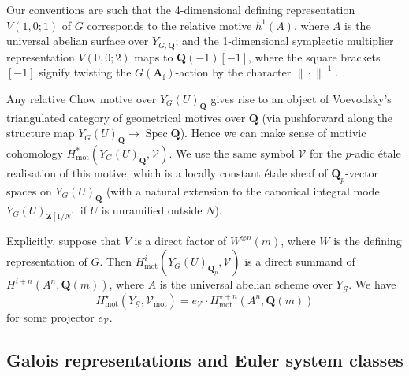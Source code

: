 \documentclass[cjm]{ipart}
\theoremstyle{plain}
\theoremstyle{remark}
\DeclareMathOperator{\mot}{mot}
\DeclareMathOperator{\Spec}{Spec}
\newcommand{\Af}{\AA_{\mathrm{f}}}
\newcommand{\QQ}{\mathbf{Q}}
\newcommand{\Qp}{\QQ_p}
\newcommand{\ZZ}{\mathbf{Z}}
\newcommand{\cV}{\mathcal{V}}
\newcommand{\sG}{\mathscr{G}}
\renewcommand{\AA}{\mathbf{A}}
\numberwithin{equation}{subsection}
\begin{document}
  \begin{remark}
   Our conventions are such that the 4-dimensional defining representation $V(1, 0; 1)$ of $G$ corresponds to the relative motive $h^1(A)$, where $A$ is the universal abelian surface over $Y_{G, \QQ}$; and the 1-dimensional symplectic multiplier representation $V(0, 0; 2)$ maps to $\QQ(-1)[-1]$, where the square brackets $[-1]$ signify twisting the $G(\Af)$-action by the character $\|\cdot\|^{-1}$.
  \end{remark}

  Any relative Chow motive over $Y_G(U)_{\QQ}$ gives rise to an object of Voevodsky's triangulated category of geometrical motives over $\QQ$ (via pushforward along the structure map $Y_G(U)_{\QQ} \to \Spec \QQ$). Hence we can make sense of motivic cohomology $H^*_{\mot}(Y_G(U)_{\QQ}, \cV)$. We use the same symbol $\cV$ for the $p$-adic \'etale realisation of this motive, which is a locally constant \'etale sheaf of $\Qp$-vector spaces on $Y_G(U)_{\QQ}$ (with a natural extension to the canonical integral model $Y_G(U)_{\ZZ[1/N]}$ if $U$ is unramified outside $N$).

  \begin{remark}
   \label{rem:Liebermann}
   Explicitly, suppose that $V$ is a direct factor of $W^{\otimes n}(m)$, where $W$ is the defining representation of $G$. Then $H^i_{\mot}(Y_G(U)_{\Qp}, \cV)$ is a direct summand of $H^{i+n}(A^n,\QQ(m))$, where $A$ is the universal abelian scheme over $Y_{\sG}$. We have
   \[ H^\star_{\mot}(Y_\sG, \cV_{\mot})=e_{\cV} \cdot H_{\mot}^{\star+n}(A^n,\QQ(m))\]
   for some projector $e_{\cV}$.
  \end{remark}

 \subsection{Galois representations and Euler system classes}
  \label{ss:modularparam}
\end{document}
